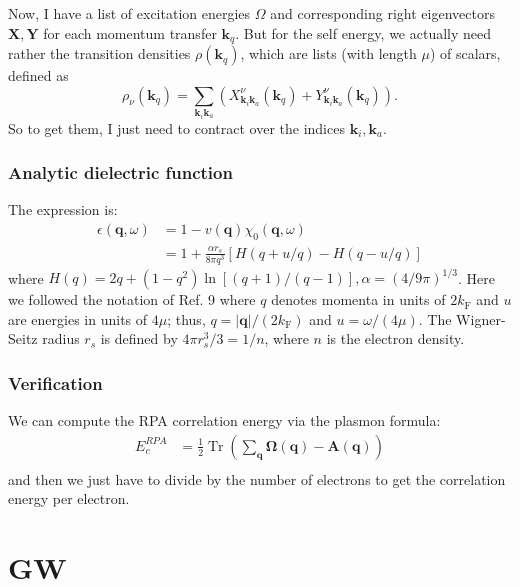 Now, I have a list of excitation energies $\Omega$ and corresponding right eigenvectors $\bm{X}, \bm{Y}$ for each momentum transfer $\bm{k}_q$. But for the self energy, we actually need rather the transition densities $\rho(\bm{k}_q)$, which are lists (with length $\mu$) of scalars, defined as
\begin{equation}
    \rho_{\nu}(\bm{k}_q) = \sum_{\bm{k}_i \bm{k}_a} \left(X_{\bm{k}_i \bm{k}_a}^\nu(\bm{k}_q) + Y_{\bm{k}_i \bm{k}_a}^\nu(\bm{k}_q)\right).
\end{equation}
So to get them, I just need to contract over the indices $\bm{k}_i, \bm{k}_a$.
\subsubsection{Analytic dielectric function}
The expression is:
\begin{align}
    \epsilon (\mathbf{q}, \omega)&=1 - v(\mathbf{q}) \chi_0(\mathbf{q}, \omega) \\
&= 1+\frac{\alpha r_s}{8 \pi q^3}[H(q+u / q)-H(q-u / q)]
\end{align}
where $H(q)=2 q+\left(1-q^2\right) \ln [(q+1) /(q-1)], \alpha= (4 / 9 \pi)^{1 / 3}$. Here we followed the notation of Ref. 9 where $q$ denotes momenta in units of $2 k_{\mathrm{F}}$ and $u$ are energies in units of $4 \mu$; thus, $q=|\mathbf{q}| /(2 k_{\mathrm{F}})$ and $u=\omega /(4 \mu)$. The Wigner-Seitz radius $r_s$ is defined by $4 \pi r_s^3 / 3=1 / n$, where $n$ is the electron density.
\subsubsection{Verification}
We can compute the RPA correlation energy via the plasmon formula:
\begin{align}
    E_c^{RPA} & = \frac{1}{2} \operatorname{Tr}(\sum_{\bm{q}} \bm{\Omega }(\bm{q}) -\bm{A}(\bm{q})) \\
\end{align}
and then we just have to divide by the number of electrons to get the correlation energy per electron.
\section{GW}

